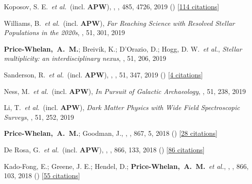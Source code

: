 {\item[{\color{deemph}\scriptsize53}]Koposov, S. E.~\textit{et al.}~(incl. \textbf{APW}), , \mnras, 485, 4726, 2019 () [\href{http://adsabs.harvard.edu/abs/2019MNRAS.485.4726K}{114 citations}]

\item[{\color{deemph}\scriptsize52}]Williams, B.~\textit{et al.}~(incl. \textbf{APW}), \textit{Far Reaching Science with Resolved Stellar Populations in the 2020s}, \baas, 51, 301, 2019

\item[{\color{deemph}\scriptsize51}]\textbf{Price-Whelan,~A.~M.}; Breivik, K.; D'Orazio, D.; Hogg, D. W.~\textit{et al.}, \textit{Stellar multiplicity: an interdisciplinary nexus}, \baas, 51, 206, 2019

\item[{\color{deemph}\scriptsize50}]Sanderson, R.~\textit{et al.}~(incl. \textbf{APW}), , \baas, 51, 347, 2019 () [\href{http://adsabs.harvard.edu/abs/2019BAAS...51c.347S}{4 citations}]

\item[{\color{deemph}\scriptsize49}]Ness, M.~\textit{et al.}~(incl. \textbf{APW}), \textit{In Pursuit of Galactic Archaeology}, \baas, 51, 238, 2019

\item[{\color{deemph}\scriptsize48}]Li, T.~\textit{et al.}~(incl. \textbf{APW}), \textit{Dark Matter Physics with Wide Field Spectroscopic Surveys}, \baas, 51, 252, 2019

\item[{\color{deemph}\scriptsize47}]\textbf{Price-Whelan,~A.~M.}; Goodman, J., , \apj, 867, 5, 2018 () [\href{http://adsabs.harvard.edu/abs/2018ApJ...867....5P}{28 citations}]

\item[{\color{deemph}\scriptsize46}]De Rosa, G.~\textit{et al.}~(incl. \textbf{APW}), , \apj, 866, 133, 2018 () [\href{http://adsabs.harvard.edu/abs/2018ApJ...866..133D}{86 citations}]

\item[{\color{deemph}\scriptsize45}]Kado-Fong, E.; Greene, J. E.; Hendel, D.; \textbf{Price-Whelan,~A.~M.}~\textit{et al.}, , \apj, 866, 103, 2018 () [\href{http://adsabs.harvard.edu/abs/2018ApJ...866..103K}{55 citations}]

}

